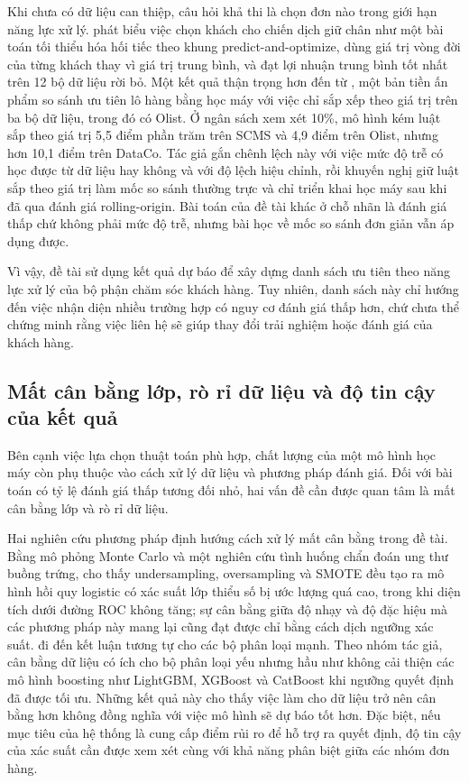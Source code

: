 \documentclass[12pt,a4paper]{report}
\begin{document}
Khi chưa có dữ liệu can thiệp, câu hỏi khả thi là chọn đơn nào trong giới hạn năng lực xử lý. \textcite{gomezvargas2025} phát biểu việc chọn khách cho chiến dịch giữ chân như một bài toán tối thiểu hóa hối tiếc theo khung predict-and-optimize, dùng giá trị vòng đời của từng khách thay vì giá trị trung bình, và đạt lợi nhuận trung bình tốt nhất trên 12 bộ dữ liệu rời bỏ. Một kết quả thận trọng hơn đến từ \textcite{li2026valuesorting}, một bản tiền ấn phẩm so sánh ưu tiên lô hàng bằng học máy với việc chỉ sắp xếp theo giá trị trên ba bộ dữ liệu, trong đó có Olist. Ở ngân sách xem xét 10\%, mô hình kém luật sắp theo giá trị 5,5 điểm phần trăm trên SCMS và 4,9 điểm trên Olist, nhưng hơn 10,1 điểm trên DataCo. Tác giả gắn chênh lệch này với việc mức độ trễ có học được từ dữ liệu hay không và với độ lệch hiệu chỉnh, rồi khuyến nghị giữ luật sắp theo giá trị làm mốc so sánh thường trực và chỉ triển khai học máy sau khi đã qua đánh giá rolling-origin. Bài toán của đề tài khác ở chỗ nhãn là đánh giá thấp chứ không phải mức độ trễ, nhưng bài học về mốc so sánh đơn giản vẫn áp dụng được.

Vì vậy, đề tài sử dụng kết quả dự báo để xây dựng danh sách ưu tiên theo năng lực xử lý của bộ phận chăm sóc khách hàng. Tuy nhiên, danh sách này chỉ hướng đến việc nhận diện nhiều trường hợp có nguy cơ đánh giá thấp hơn, chứ chưa thể chứng minh rằng việc liên hệ sẽ giúp thay đổi trải nghiệm hoặc đánh giá của khách hàng.

\subsection{Mất cân bằng lớp, rò rỉ dữ liệu và độ tin cậy của kết quả}\label{sec:rel-imbalance}

Bên cạnh việc lựa chọn thuật toán phù hợp, chất lượng của một mô hình học máy còn phụ thuộc vào cách xử lý dữ liệu và phương pháp đánh giá. Đối với bài toán có tỷ lệ đánh giá thấp tương đối nhỏ, hai vấn đề cần được quan tâm là mất cân bằng lớp và rò rỉ dữ liệu.

Hai nghiên cứu phương pháp định hướng cách xử lý mất cân bằng trong đề tài. Bằng mô phỏng Monte Carlo và một nghiên cứu tình huống chẩn đoán ung thư buồng trứng, \textcite{vandengoorbergh2022} cho thấy undersampling, oversampling và SMOTE đều tạo ra mô hình hồi quy logistic có xác suất lớp thiểu số bị ước lượng quá cao, trong khi diện tích dưới đường ROC không tăng; sự cân bằng giữa độ nhạy và độ đặc hiệu mà các phương pháp này mang lại cũng đạt được chỉ bằng cách dịch ngưỡng xác suất. \textcite{elor2022smote} đi đến kết luận tương tự cho các bộ phân loại mạnh. Theo nhóm tác giả, cân bằng dữ liệu có ích cho bộ phân loại yếu nhưng hầu như không cải thiện các mô hình boosting như LightGBM, XGBoost và CatBoost khi ngưỡng quyết định đã được tối ưu. Những kết quả này cho thấy việc làm cho dữ liệu trở nên cân bằng hơn không đồng nghĩa với việc mô hình sẽ dự báo tốt hơn. Đặc biệt, nếu mục tiêu của hệ thống là cung cấp điểm rủi ro để hỗ trợ ra quyết định, độ tin cậy của xác suất cần được xem xét cùng với khả năng phân biệt giữa các nhóm đơn hàng.
\end{document}

